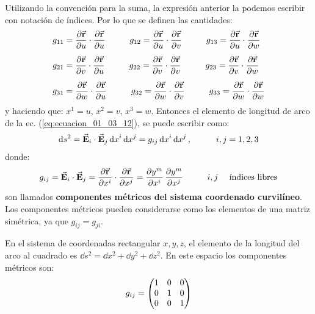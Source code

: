 \documentclass[hidelinks,12pt]{article}
\begin{document}
Utilizando la convención para la suma, la expresión anterior la podemos escribir con notación de índices. Por lo que se definen las cantidades:
\begin{align*}
g_{11} &= \pdv{\va{r}}{u} \cdot \pdv{\va{r}}{u} \hspace{1cm} g_{12} = \pdv{\va{r}}{u} \cdot \pdv{\va{r}}{v} \hspace{1cm} g_{13} = \pdv{\va{r}}{u} \cdot \pdv{\va{r}}{w} \\[0.5em]
g_{21} &= \pdv{\va{r}}{v} \cdot \pdv{\va{r}}{u} \hspace{1cm} g_{22} = \pdv{\va{r}}{v} \cdot \pdv{\va{r}}{v} \hspace{1cm} g_{23} = \pdv{\va{r}}{v} \cdot \pdv{\va{r}}{w} \\[0.5em]
g_{31} &= \pdv{\va{r}}{w} \cdot \pdv{\va{r}}{u} \hspace{1cm} g_{32} = \pdv{\va{r}}{w} \cdot \pdv{\va{r}}{v} \hspace{1cm} g_{33} = \pdv{\va{r}}{w} \cdot \pdv{\va{r}}{w}
\end{align*}
y haciendo que: $x^{1} = u$, $x^{2} = v$, $x^{3} = w$. Entonces el elemento de longitud de arco de la ec. (\ref{eq:ecuacion_01_03_12}), se puede escribir como:
\begin{align*}
\dd{s}^{2} = \va{E}_{i} \cdot \va{E}_{j} \dd{x}^{i} \dd{x}^{j} = g_{ij} \dd{x}^{i} \dd{x}^{j}, \hspace{1cm} i, j = 1, 2, 3
\end{align*}
donde:
\begin{align}
g_{ij} = \va{E}_{i} \cdot \va{E}_{j} = \pdv{\va{r}}{x^{i}} \cdot \pdv{\va{r}}{x^{j}} = \pdv{y^{m}}{x^{i}} \, \pdv{y^{m}}{x^{j}} \hspace{1cm} i, j \quad \mbox{ índices libres}
\label{eq:ecuacion_01_03_13}
\end{align}
son llamados \textbf{componentes métricos del sistema coordenado curvilíneo}. Los componentes métricos pueden considerarse como los elementos de una matriz simétrica, ya que $g_{ij} = g_{ji}$.
\par
En el sistema de coordenadas rectangular $x, y, z$, el elemento de la longitud del arco al cuadrado es $\dd{s}^{2} = \dd{x}^{2} + \dd{y}^{2} + \dd{z}^{2}$. En este espacio los componentes métricos son:
\begin{align*}
g_{ij} = \mqty(
1 & 0 & 0 \\
0 & 1 & 0 \\
0 & 0 & 1 )
\end{align*}
\end{document}
